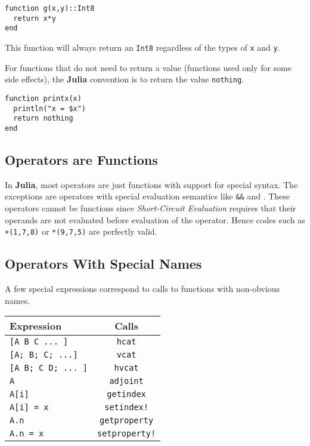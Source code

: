 \documentclass[
]{article}
\begin{document}
\begin{verbatim}
function g(x,y)::Int8
  return x*y
end
\end{verbatim}

This function will always return an \texttt{Int8} regardless of the
types of \texttt{x} and \texttt{y}.

For functions that do not need to return a value (functions used only
for some side effects), the \textbf{Julia} convention is to return the
value \texttt{nothing}.

\begin{verbatim}
function printx(x)
  println("x = $x")
  return nothing
end
\end{verbatim}

\hypertarget{operators-are-functions}{%
\subsection{Operators are Functions}\label{operators-are-functions}}

In \textbf{Julia}, most operators are just functions with support for
special syntax. The exceptions are operators with special evaluation
semantics like \texttt{\&\&} and \texttt{\textbar{}\textbar{}}. These
operators cannot be functions since \emph{Short-Circuit Evaluation}
requires that their operands are not evaluated before evaluation of the
operator. Hence codes such as \texttt{+(1,7,8)} or \texttt{*(9,7,5)} are
perfectly valid.

\hypertarget{operators-with-special-names}{%
\subsection{Operators With Special
Names}\label{operators-with-special-names}}

A few special expressions correspond to calls to functions with
non-obvious names.

\begin{longtable}[]{@{}lc@{}}
\toprule\noalign{}
Expression & Calls \\
\midrule\noalign{}
\endhead
\bottomrule\noalign{}
\endlastfoot
\texttt{{[}A\ B\ C\ ...\ {]}} & \texttt{hcat} \\
\texttt{{[}A;\ B;\ C;\ ...{]}} & \texttt{vcat} \\
\texttt{{[}A\ B;\ C\ D;\ ...\ {]}} & \texttt{hvcat} \\
\texttt{A\textquotesingle{}} & \texttt{adjoint} \\
\texttt{A{[}i{]}} & \texttt{getindex} \\
\texttt{A{[}i{]}\ =\ x} & \texttt{setindex!} \\
\texttt{A.n} & \texttt{getproperty} \\
\texttt{A.n\ =\ x} & \texttt{setproperty!} \\
\end{longtable}
\end{document}
